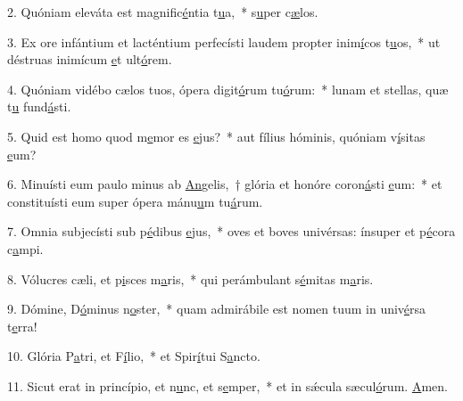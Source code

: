 2. Quóniam eleváta est magnific\uline{é}ntia t\uline{u}a,~* s\uline{u}per c\uline{æ}los.\par 
3. Ex ore infántium et lacténtium perfecísti laudem propter inim\uline{í}cos t\uline{u}os,~* ut déstruas inimícum \uline{e}t ult\uline{ó}rem.\par 
4. Quóniam vidébo cælos tuos, ópera digit\uline{ó}rum tu\uline{ó}rum:~* lunam et stellas, quæ t\uline{u} fund\uline{á}sti.\par 
5. Quid est homo quod m\uline{e}mor es \uline{e}jus?~* aut fílius hóminis, quóniam v\uline{í}sitas \uline{e}um?\par 
6. Minuísti eum paulo minus ab \uline{An}gelis,~† glória et honóre coron\uline{á}sti \uline{e}um:~* et constituísti eum super ópera mánu\uline{u}m tu\uline{á}rum.\par 
7. Omnia subjecísti sub p\uline{é}dibus \uline{e}jus,~* oves et boves univérsas: ínsuper et p\uline{é}cora c\uline{a}mpi.\par 
8. Vólucres cæli, et p\uline{i}sces m\uline{a}ris,~* qui perámbulant s\uline{é}mitas m\uline{a}ris.\par 
9. Dómine, D\uline{ó}minus n\uline{o}ster,~* quam admirábile est nomen tuum in univ\uline{é}rsa t\uline{e}rra!\par 
10. Glória P\uline{a}tri, et F\uline{í}lio,~* et Spir\uline{í}tui S\uline{a}ncto.\par 
11. Sicut erat in princípio, et n\uline{u}nc, et s\uline{e}mper,~* et in sǽcula sæcul\uline{ó}rum. \uline{A}men.\par 
